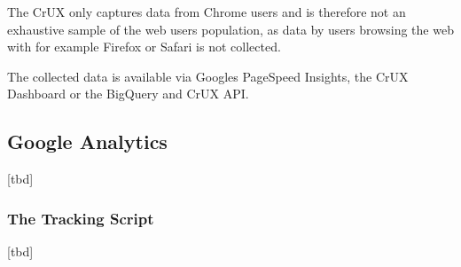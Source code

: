 The CrUX only captures data from Chrome users and is therefore not an exhaustive sample of the web users population, as data by users browsing the web with for example Firefox or Safari is not collected.

The collected data is available via Googles PageSpeed Insights, the CrUX Dashboard or the BigQuery and CrUX API. %







\subsection{Google Analytics}

[tbd]





\subsubsection{The Tracking Script}

[tbd]











